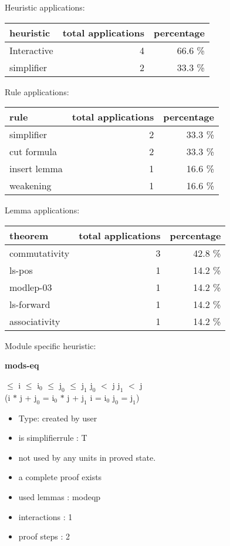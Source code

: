 \documentclass[a4paper]{article}
\begin{document}
\medskip


Heuristic applications:

\begin{supertabular}{l|r|r}
heuristic	& total applications & percentage \\ \hline
Interactive & 4 & 66.6 \% \\
simplifier & 2 & 33.3 \% \\

\end{supertabular}

Rule applications:

\begin{supertabular}{l|r|r}
rule	        & total applications & percentage \\ \hline
simplifier & 2 & 33.3 \% \\
cut formula & 2 & 33.3 \% \\
insert lemma & 1 & 16.6 \% \\
weakening & 1 & 16.6 \% \\

\end{supertabular}

Lemma applications:

\begin{supertabular}{l|r|r}
theorem	        & total applications & percentage \\ \hline
commutativity & 3 & 42.8 \% \\
ls-pos & 1 & 14.2 \% \\
modlep-03 & 1 & 14.2 \% \\
ls-forward & 1 & 14.2 \% \\
associativity & 1 & 14.2 \% \\

\end{supertabular}

Module specific heuristic:

\pagebreak

{\LARGE\bf mods-eq}\label{lemma-mods-eq}

\medskip

\Fol {} $\le$ i  $\le$ $\mbox{i}_{0}$  $\le$ $\mbox{j}_{0}$  $\le$ $\mbox{j}_{1}$ \And $\mbox{j}_{0}$ $<$ j \And $\mbox{j}_{1}$ $<$ j \\
 \tabf \Imp (i $*$ j + $\mbox{j}_{0}$ = $\mbox{i}_{0}$ $*$ j + $\mbox{j}_{1}$ \Equiv i = $\mbox{i}_{0}$ \And $\mbox{j}_{0}$ = $\mbox{j}_{1}$)

\begin{itemize}

\item Type: created by user

\item is simplifierrule : T
\item not used by any units in proved state.
\item       a complete proof exists
\item       used lemmas  : modeqp
\item       interactions : 1
\item       proof steps  : 2
\end{itemize}
\end{document}
